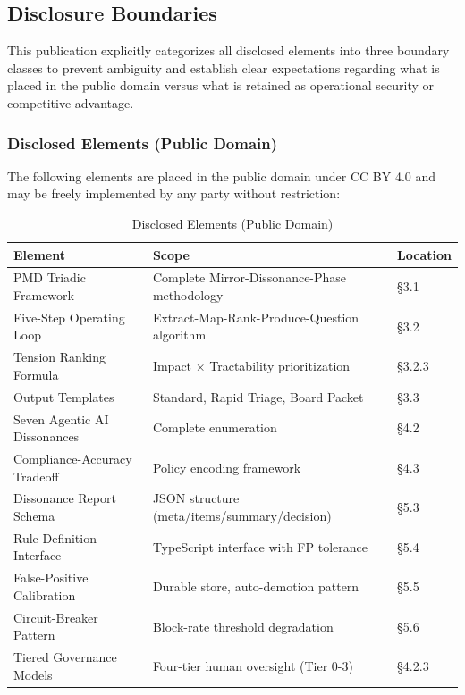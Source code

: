 \documentclass[11pt,a4paper]{article}
\begin{document}
\subsection{Disclosure Boundaries}

This publication explicitly categorizes all disclosed elements into three boundary classes to prevent ambiguity and establish clear expectations regarding what is placed in the public domain versus what is retained as operational security or competitive advantage.

\subsubsection{Disclosed Elements (Public Domain)}

The following elements are placed in the public domain under CC BY 4.0 and may be freely implemented by any party without restriction:

\begin{table}[h]
\centering
\small
\begin{tabular}{|p{4cm}|p{5cm}|p{2cm}|}
\hline
\textbf{Element} & \textbf{Scope} & \textbf{Location} \\ \hline
PMD Triadic Framework & Complete Mirror-Dissonance-Phase methodology & §3.1 \\ \hline
Five-Step Operating Loop & Extract-Map-Rank-Produce-Question algorithm & §3.2 \\ \hline
Tension Ranking Formula & Impact × Tractability prioritization & §3.2.3 \\ \hline
Output Templates & Standard, Rapid Triage, Board Packet & §3.3 \\ \hline
Seven Agentic AI Dissonances & Complete enumeration & §4.2 \\ \hline
Compliance-Accuracy Tradeoff & Policy encoding framework & §4.3 \\ \hline
Dissonance Report Schema & JSON structure (meta/items/summary/decision) & §5.3 \\ \hline
Rule Definition Interface & TypeScript interface with FP tolerance & §5.4 \\ \hline
False-Positive Calibration & Durable store, auto-demotion pattern & §5.5 \\ \hline
Circuit-Breaker Pattern & Block-rate threshold degradation & §5.6 \\ \hline
Tiered Governance Models & Four-tier human oversight (Tier 0-3) & §4.2.3 \\ \hline
\end{tabular}
\caption{Disclosed Elements (Public Domain)}
\label{tab:disclosed_elements}
\end{table}
\end{document}
